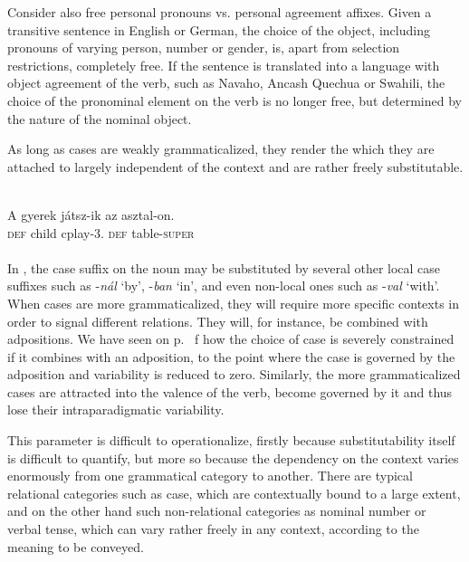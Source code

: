 Consider also free personal pronouns vs. personal agreement affixes. Given a transitive sentence in English or German, the choice of the object, including pronouns of varying person, number or gender, is, apart from selection restrictions, completely free. If the sentence is translated into a language with object agreement of the verb, such as Navaho, Ancash Quechua or Swahili, the choice of the pronominal element on the verb is no longer free, but determined by the nature of the nominal object.

As long as cases are weakly grammaticalized, they render the \np which they are attached to largely independent of the context and are rather freely substitutable.

\setcounter{equation}{103}
\ea\label{ex:E104}
\langinfo{\LangHung}{}{} \\
\gll     A  gyerek  játsz-ik  az  asztal-on.\\
\textsc{def}  child  {cplay-3.\glgen}  \textsc{def}  table-\textsc{super}\\
\\
\z
\newpage
\noindent In , the case suffix on the noun may be substituted by several other local case suffixes such as -\textit{nál} ‘by’, -\textit{ban} ‘in’, and even non-local ones such as -\textit{val} ‘with’. When cases are more grammaticalized, they will require more specific contexts in order to signal different relations. They will, for instance, be combined with adpositions. We have seen on p.~\pageref{page100c}%
f how the choice of case is severely constrained if it combines with an adposition, to the point where the case is governed by the adposition and variability is reduced to zero. Similarly, the more grammaticalized cases are attracted into the valence of the verb, become governed by it and thus lose their intraparadigmatic variability.

This parameter is difficult to operationalize, firstly because substitutability itself is difficult to quantify, but more so because the dependency on the context varies enormously from one grammatical category to another. There are typical relational categories such as case, which are contextually bound to a large extent, and on the other hand such non-relational categories as nominal number or verbal tense, which can vary rather freely in any context, according to the meaning to be conveyed.

